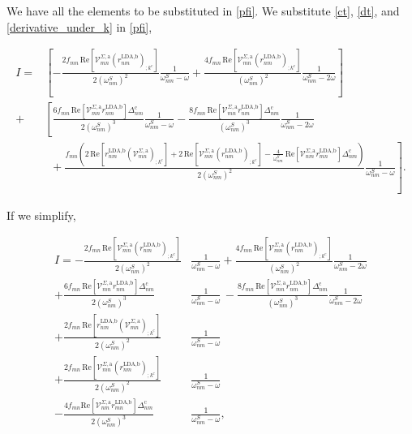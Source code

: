 \documentclass[10pt]{article}
\begin{document}
We have all the elements to be substituted in \eqref{pfi}. We substitute \eqref{ct}, \eqref{dt}, and \eqref{derivative_under_k} in \eqref{pfi},

\begin{align*}
I
= &\left[-\frac{2f_{mn}\,\mathrm{Re}\left[\mathcal{V}^{\Sigma,\text{a}}_{mn}\left(r^{\text{LDA,b}}_{nm}\right)_{;k^{\text{c}}}\right]}{2(\omega^{S}_{nm})^{2}}\frac{1}{\omega^{S}_{nm}-\omega} + \frac{4f_{mn}\,\mathrm{Re}\left[\mathcal{V}^{\Sigma,\text{a}}_{mn}\left(r^{\text{LDA,b}}_{nm}\right)_{;k^{\text{c}}}\right]}{(\omega^{S}_{nm})^{2}}\frac{1}{\omega^{S}_{nm}-2\omega}\right]\nonumber\\
+ &\left[\frac{6f_{mn}\,\mathrm{Re}\left[\mathcal{V}^{\Sigma,\text{a}}_{mn}r^{\text{LDA,b}}_{nm}\right]\Delta^{\text{c}}_{nm}}{2(\omega^{S}_{nm})^{3}}\frac{1}{\omega^{S}_{nm}-\omega} 
- \frac{8f_{mn}\,\mathrm{Re}\left[\mathcal{V}^{\Sigma,\text{a}}_{mn}r^{\text{LDA,b}}_{nm}\right]\Delta^{\text{c}}_{nm}}{(\omega^{S}_{nm})^{3}}\frac{1}{\omega^{S}_{nm}-2\omega}\right.\nonumber\\
&\,\,\,+ \left.\frac{f_{mn}\left(2\,\mathrm{Re}\left[r^{\text{LDA,b}}_{nm}\left(\mathcal{V}^{\Sigma,\text{a}}_{mn}\right)_{;k^{\text{c}}}\right] + 2\,\mathrm{Re}\left[\mathcal{V}^{\Sigma,\text{a}}_{mn}\left(r^{\text{LDA,b}}_{nm}\right)_{;k^{\text{c}}}\right] - \frac{4}{\omega^{S}_{nm}}\,\mathrm{Re}\left[\mathcal{V}^{\Sigma,\text{a}}_{nm}r^{\text{LDA,b}}_{mn}\right]\Delta_{nm}^{\text{c}}\right)}{2(\omega^{S}_{nm})^{2}}\frac{1}{\omega^S_{nm}-\omega}\right].
\end{align*}

If we simplify,

\begin{align}\label{simplified_i} 
I =
-\frac{2f_{mn}\,\mathrm{Re}\left[\mathcal{V}^{\Sigma,\text{a}}_{mn}\left(r^{\text{LDA,b}}_{nm}\right)_{;k^{\text{c}}}\right]}{2(\omega^{S}_{nm})^{2}}&\frac{1}{\omega^{S}_{nm}-\omega}
+ \frac{4f_{mn}\,\mathrm{Re}\left[\mathcal{V}^{\Sigma,\text{a}}_{mn}\left(r^{\text{LDA,b}}_{nm}\right)_{;k^{\text{c}}}\right]}{(\omega^{S}_{nm})^{2}}\frac{1}{\omega^{S}_{nm}-2\omega}\nonumber\\
+ \frac{6f_{mn}\,\mathrm{Re}\left[\mathcal{V}^{\Sigma,\text{a}}_{mn}r^{\text{LDA,b}}_{nm}\right]\Delta^{\text{c}}_{nm}}{2(\omega^{S}_{nm})^{3}}&\frac{1}{\omega^{S}_{nm}-\omega} 
\,- \frac{8f_{mn}\,\mathrm{Re}\left[\mathcal{V}^{\Sigma,\text{a}}_{mn}r^{\text{LDA,b}}_{nm}\right]\Delta^{\text{c}}_{nm}}{(\omega^{S}_{nm})^{3}}\frac{1}{\omega^{S}_{nm}-2\omega}\nonumber\\
+ \frac{2f_{mn}\,\mathrm{Re}\left[r^{\text{LDA,b}}_{nm}\left(\mathcal{V}^{\Sigma,\text{a}}_{mn}\right)_{;k^{\text{c}}}\right]}{2(\omega^{S}_{nm})^{2}}&\frac{1}{\omega^{S}_{nm}-\omega}\nonumber\\
+ \frac{2f_{mn}\,\mathrm{Re}\left[\mathcal{V}^{\Sigma,\text{a}}_{mn}\left(r^{\text{LDA,b}}_{nm}\right)_{;k^{\text{c}}}\right]}{2(\omega^{S}_{nm})^{2}}&\frac{1}{\omega^{S}_{nm}-\omega}\nonumber\\
- \frac{4f_{mn}\mathrm{Re}\left[\mathcal{V}^{\Sigma,\text{a}}_{nm}r^{\text{LDA,b}}_{mn}\right]\Delta_{nm}^{\text{c}}}{2(\omega^{S}_{nm})^{3}}&\frac{1}{\omega^{S}_{nm}-\omega},
\end{align}
\end{document}
